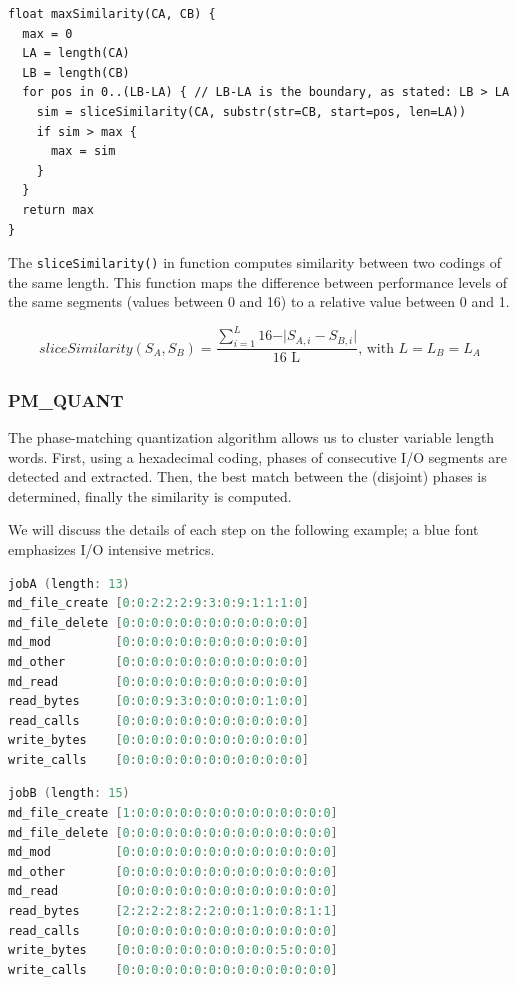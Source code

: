 \documentclass[]{llncs}
\begin{document}
\begin{lstlisting}
float maxSimilarity(CA, CB) {
  max = 0
  LA = length(CA)
  LB = length(CB)
  for pos in 0..(LB-LA) { // LB-LA is the boundary, as stated: LB > LA
    sim = sliceSimilarity(CA, substr(str=CB, start=pos, len=LA))
    if sim > max {
      max = sim
    }
  }
  return max
}
\end{lstlisting}

The \texttt{sliceSimilarity()} in  function computes similarity between two codings of the same length.
This function maps the difference between performance levels of the same segments (values between 0 and 16) to a relative value between 0 and 1.

\begin{equation}
sliceSimilarity \left( S_{A},S_{B} \right) =\frac{ \sum _{i=1}^{L_{}}16 - \vert S_{A,i}-S_{B,i} \vert }{\text{16 L}_{}}\text{, with }L=L_{B}=L_{A} \label{eq:slicesim}
\end{equation}

\subsubsection{PM\_QUANT}
The phase-matching quantization algorithm allows us to cluster variable length words.
First, using a hexadecimal coding, phases of consecutive I/O segments are detected and extracted.
Then, the best match between the (disjoint) phases is determined, finally the similarity is computed.

We will discuss the details of each step on the following example; a blue font emphasizes I/O intensive  metrics.

\begin{lstlisting}[language=C,morekeywords={md_file_create,read_bytes}]
jobA (length: 13)
md_file_create [0:0:2:2:2:9:3:0:9:1:1:1:0]
md_file_delete [0:0:0:0:0:0:0:0:0:0:0:0:0]
md_mod         [0:0:0:0:0:0:0:0:0:0:0:0:0]
md_other       [0:0:0:0:0:0:0:0:0:0:0:0:0]
md_read        [0:0:0:0:0:0:0:0:0:0:0:0:0]
read_bytes     [0:0:0:9:3:0:0:0:0:0:1:0:0]
read_calls     [0:0:0:0:0:0:0:0:0:0:0:0:0]
write_bytes    [0:0:0:0:0:0:0:0:0:0:0:0:0]
write_calls    [0:0:0:0:0:0:0:0:0:0:0:0:0]
\end{lstlisting}

\vspace*{-0.5em}

\begin{lstlisting}[language=C,morekeywords={md_file_create,read_bytes,write_bytes}]
jobB (length: 15)
md_file_create [1:0:0:0:0:0:0:0:0:0:0:0:0:0:0]
md_file_delete [0:0:0:0:0:0:0:0:0:0:0:0:0:0:0]
md_mod         [0:0:0:0:0:0:0:0:0:0:0:0:0:0:0]
md_other       [0:0:0:0:0:0:0:0:0:0:0:0:0:0:0]
md_read        [0:0:0:0:0:0:0:0:0:0:0:0:0:0:0]
read_bytes     [2:2:2:2:8:2:2:0:0:1:0:0:8:1:1]
read_calls     [0:0:0:0:0:0:0:0:0:0:0:0:0:0:0]
write_bytes    [0:0:0:0:0:0:0:0:0:0:0:5:0:0:0]
write_calls    [0:0:0:0:0:0:0:0:0:0:0:0:0:0:0]
\end{lstlisting}
\end{document}
